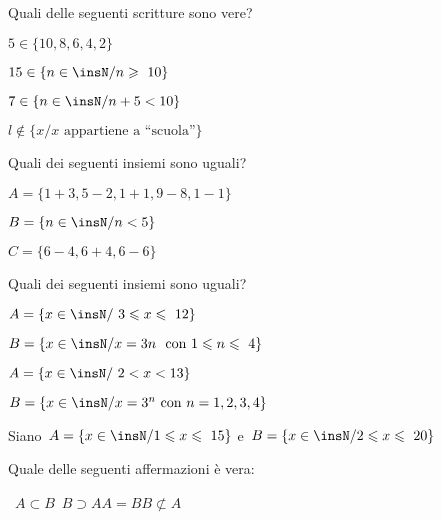 \begin{esercizio}
\label{ese:6.30}
Quali delle seguenti scritture sono vere?
\begin{multicols}{2}
\begin{enumeratea}
\item $5\in \{10,8,6,4,2\}$\hfill\boxV\quad\boxF
\item $15\in \{n\in\insN/n\geqslant~10\}$\hfill\boxV\quad\boxF
\item $7\in \{n\in\insN/n+5<10\}$\hfill\boxV\quad\boxF
\item $l\notin\{x/x\text{ appartiene a ``scuola''}\}$\hfill\boxV\quad\boxF
\end{enumeratea}
\end{multicols}
\end{esercizio}

\begin{esercizio}
\label{ese:6.31}
Quali dei seguenti insiemi sono uguali?
\begin{multicols}{2}
 \begin{enumeratea}
 \item $A=\{1+3, 5-2, 1+1, 9-8, 1-1\}$
\item $B=\{n\in\insN/n<5\}$
\item $C=\{6-4, 6+4, 6-6\}$
 \end{enumeratea}
\end{multicols}
\end{esercizio}


\begin{esercizio}
\label{ese:6.32}
Quali dei seguenti insiemi sono uguali?
\begin{multicols}{2}
\begin{enumeratea}
\item $A=\{x\in\insN/\ 3\leqslant x\leqslant~12\}$
\item $B=\{x\in\insN/x=3n\ \text{ con } 1\leqslant n\leqslant~4\}$
\item $A=\{x\in\insN/\ 2<x<13\}$
\item $B=\{x\in\insN/x=3^{n}\text{ con }n=1,2,3,4\}$
\end{enumeratea}
\end{multicols}
\end{esercizio}

\begin{esercizio}
\label{ese:7.39}
Siano~$A=\{x\in\insN/1\leqslant x\leqslant~15\}$ e~$B=\{x\in\insN/2\leqslant 
x\leqslant~20\}$
\begin{center}

\end{center}
Quale delle seguenti affermazioni è vera:
\begin{center}
\boxA\quad~$A\subset B$\quad\boxB\quad~$B\supset 
A$\quad\boxC\quad$A=B$\quad\boxD\quad$B\not\subset A$
\end{center}
\end{esercizio}

